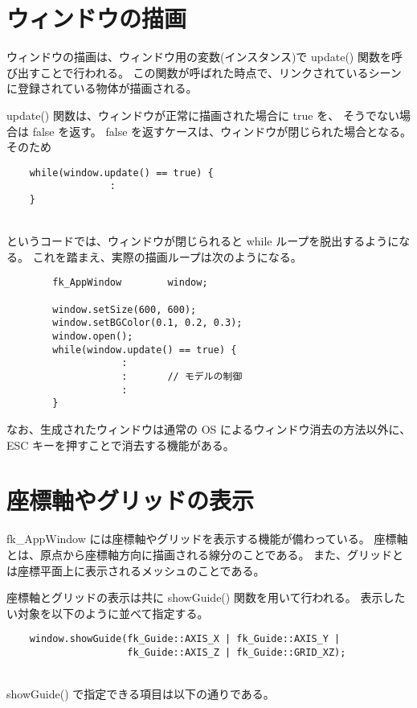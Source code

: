 \section{ウィンドウの描画}
ウィンドウの描画は、ウィンドウ用の変数(インスタンス)で update() 関数を呼び出すことで行われる。
この関数が呼ばれた時点で、リンクされているシーンに登録されている物体が描画される。

update() 関数は、ウィンドウが正常に描画された場合に true を、
そうでない場合は false を返す。
false を返すケースは、ウィンドウが閉じられた場合となる。
そのため
\\
\begin{screen}
\begin{verbatim}
    while(window.update() == true) {
                  :
    }
\end{verbatim}
\end{screen}
~ \\
というコードでは、ウィンドウが閉じられると while ループを脱出するようになる。
これを踏まえ、実際の描画ループは次のようになる。
\\
\begin{breakbox}
\begin{verbatim}
        fk_AppWindow        window;

        window.setSize(600, 600);
        window.setBGColor(0.1, 0.2, 0.3);
        window.open();
        while(window.update() == true) {
                    :
                    :       // モデルの制御
                    :
        }       
\end{verbatim}
\end{breakbox}

なお、生成されたウィンドウは通常の OS によるウィンドウ消去の方法以外に、
ESC キーを押すことで消去する機能がある。

\section{座標軸やグリッドの表示}
fk\_AppWindow には座標軸やグリッドを表示する機能が備わっている。
座標軸とは、原点から座標軸方向に描画される線分のことである。
また、グリッドとは座標平面上に表示されるメッシュのことである。

座標軸とグリッドの表示は共に showGuide() 関数を用いて行われる。
表示したい対象を以下のように並べて指定する。
\\
\begin{screen}
\begin{verbatim}
    window.showGuide(fk_Guide::AXIS_X | fk_Guide::AXIS_Y |
                     fk_Guide::AXIS_Z | fk_Guide::GRID_XZ);
\end{verbatim}
\end{screen}
~ \\
showGuide() で指定できる項目は以下の通りである。

